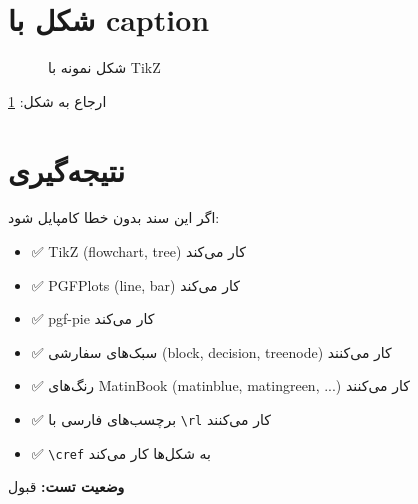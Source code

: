 \documentclass{matinbook}
\begin{document}
\begin{latin}
\end{latin}

\section{شکل با caption}
\label{sec:figure-caption}

\begin{figure}[h]
\centering
{}
\caption{شکل نمونه با TikZ}
\label{fig:graphics-test}
\end{figure}

ارجاع به شکل: \cref{fig:graphics-test}

\section{نتیجه‌گیری}
\label{sec:conclusion}

اگر این سند بدون خطا کامپایل شود:

\begin{itemize}
    \item ✅ TikZ (flowchart, tree) کار می‌کند
    \item ✅ PGFPlots (line, bar) کار می‌کند
    \item ✅ pgf-pie کار می‌کند
    \item ✅ سبک‌های سفارشی (block, decision, treenode) کار می‌کنند
    \item ✅ رنگ‌های MatinBook (matinblue, matingreen, ...) کار می‌کنند
    \item ✅ برچسب‌های فارسی با \texttt{\textbackslash rl} کار می‌کنند
    \item ✅ \texttt{\textbackslash cref} به شکل‌ها کار می‌کند
\end{itemize}

\textbf{وضعیت تست:} قبول
\end{document}
